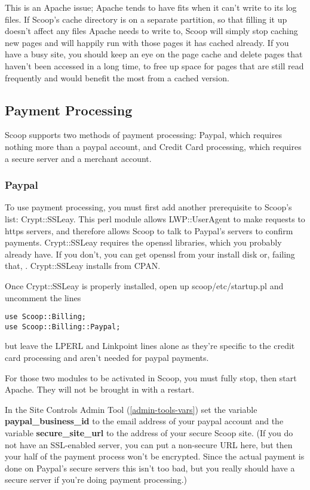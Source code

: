 This is an Apache issue; Apache tends to have fits when it can't write to its log files. If Scoop's cache directory is on a separate partition, so that filling it up doesn't affect any files Apache needs to write to, Scoop will simply stop caching new pages and will happily run with those pages it has cached already. If you have a busy site, you should keep an eye on the page cache and delete pages that haven't been accessed in a long time, to free up space for pages that are still read frequently and would benefit the most from a cached version.

\subsection{Payment Processing}
\label{features-cc-paypal}

Scoop supports two methods of payment processing: Paypal, which requires nothing more than a paypal account, and Credit Card processing, which requires a secure server and a merchant account.

\subsubsection{Paypal}

To use payment processing, you must first add another prerequisite to Scoop's list: Crypt::SSLeay. This perl module allows LWP::UserAgent to make requests to https servers, and therefore allows Scoop to talk to Paypal's servers to confirm payments. Crypt::SSLeay requires the openssl libraries, which you probably already have. If you don't, you can get openssl from your install disk or, failing that, . Crypt::SSLeay installs from CPAN.

Once Crypt::SSLeay is properly installed, open up scoop/etc/startup.pl and uncomment the lines
\begin{verbatim}
use Scoop::Billing;
use Scoop::Billing::Paypal;
\end{verbatim}
but leave the LPERL and Linkpoint lines alone as they're specific to the credit card processing and aren't needed for paypal payments.

For those two modules to be activated in Scoop, you must fully stop, then start Apache. They will not be brought in with a restart.

In the Site Controls Admin Tool (\ref{admin-tools-vars}) set the variable {\bf paypal\_business\_id} to the email address of your paypal account and the variable {\bf secure\_site\_url} to the address of your secure Scoop site. (If you do not have an SSL-enabled server, you can put a non-secure URL here, but then your half of the payment process won't be encrypted. Since the actual payment is done on Paypal's secure servers this isn't too bad, but you really should have a secure server if you're doing payment processing.)

